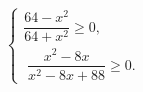 \begin{ex}[type=ineq_system]
	\begin{condition}
		$\begin{cases}  \dfrac{64 - x^2}{64 + x^2}\geqslant0,\\
			\; \dfrac{x^2 - 8x}{x^2 - 8x  + 88}\geqslant0  .
		\end{cases}$
	\end{condition}
\end{ex}